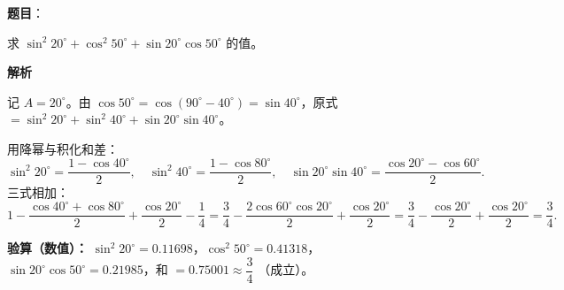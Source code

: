 \begin{answer}

\textbf{题目}：

求 $\sin^2 20^\circ+\cos^2 50^\circ+\sin20^\circ\cos50^\circ$ 的值。

\textbf{解析}

记 $A=20^\circ$。由 $\cos50^\circ=\cos(90^\circ-40^\circ)=\sin40^\circ$，原式 $=\sin^2 20^\circ+\sin^2 40^\circ+\sin20^\circ\sin40^\circ$。

用降幂与积化和差：
\nopagebreak[4]
\[\sin^2 20^\circ=\frac{1-\cos40^\circ}{2},\quad \sin^2 40^\circ=\frac{1-\cos80^\circ}{2},\quad \sin20^\circ\sin40^\circ=\frac{\cos20^\circ-\cos60^\circ}{2}.\]
三式相加：
\nopagebreak[4]
\[1-\frac{\cos40^\circ+\cos80^\circ}{2}+\frac{\cos20^\circ}{2}-\frac14=\frac34-\frac{2\cos60^\circ\cos20^\circ}{2}+\frac{\cos20^\circ}{2}=\frac34-\frac{\cos20^\circ}{2}+\frac{\cos20^\circ}{2}=\frac34.\]

\textbf{验算（数值）：} $\sin^2 20^\circ=0.11698$，$\cos^2 50^\circ=0.41318$，$\sin20^\circ\cos50^\circ=0.21985$，和 $=0.75001\approx\dfrac34$ （成立）。


\par\medskip

\end{answer}

